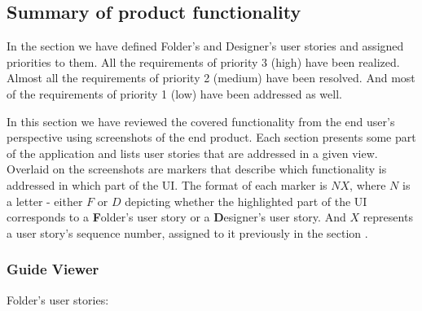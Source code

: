 \subsection{Summary of product functionality}

In the  section we have defined Folder's and Designer's user stories and assigned priorities to them.
All the requirements of priority 3 (high) have been realized.
Almost all the requirements of priority 2 (medium) have been resolved.
And most of the requirements of priority 1 (low) have been addressed as well.
\smallskip

In this section we have reviewed the covered functionality from the end user's perspective using screenshots of the end product.
Each section presents some part of the application and lists user stories that are addressed in a given view.
Overlaid on the screenshots are markers that describe which functionality is addressed in which part of the UI.
The format of each marker is $NX$, where $N$ is a letter - either $F$ or $D$ depicting whether  
the highlighted part of the UI corresponds to a \textbf{F}older's user story or a \textbf{D}esigner's user story.
And $X$ represents a user story's sequence number, assigned to it previously in the section .

\subsubsection{Guide Viewer}

Folder's user stories:
\begin{enumerate}
	\setcounter{enumi}{0}

	\setcounter{enumi}{13}

\end{enumerate}

